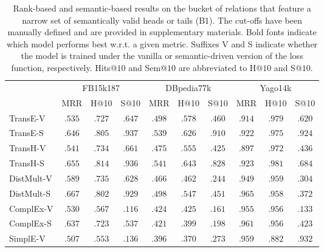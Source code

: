 \documentclass[letterpaper]{article} %
\begin{document}
\begin{table*}
        \caption{Rank-based and semantic-based results on the bucket of relations that feature a narrow set of semantically valid heads or tails (B1). The cut-offs have been manually defined and are provided in supplementary materials. Bold fonts indicate which model performs best w.r.t. a given metric. Suffixes V and S indicate whether the model is trained under the vanilla or semantic-driven version of the loss function, respectively. Hits@$10$ and Sem@$10$ are abbreviated to H@$10$ and S@$10$.}
	\label{tab:bucket1}
    \small
	\centering
                \setlength{\tabcolsep}{0.15cm}
			\begin{tabular}{lccccccccc}
                    \hline
				&\multicolumn{3}{c}{FB15k187} & \multicolumn{3}{c}{DBpedia77k} & \multicolumn{3}{c}{Yago14k} 
                \\
                    & MRR & H@10 & S@10 &
                    MRR & H@10 & S@10 &
                    MRR & H@10 & S@10 \\
				\hline
				TransE-V &
    $.535$&$.727$&$.647$& $.498$&$.578$&$.460$& $.914$&$\mathbf{.979}$&$.620$\\
                TransE-S &
    $\mathbf{.646}$&$\mathbf{.805}$&$\mathbf{.937}$& 
    $\mathbf{.539}$&$\mathbf{.626}$&$\mathbf{.910}$& 
    $\mathbf{.922}$&$.975$&$\mathbf{.924}$ \\
    \hline
                TransH-V &
    $.541$&$.734$&$.661$& $.475$&$.555$&$.425$& $.897$&$.972$&$.436$ \\
                TransH-S &
    $\mathbf{.655}$&$\mathbf{.814}$&$\mathbf{.936}$& 
    $\mathbf{.541}$&$\mathbf{.643}$&$\mathbf{.828}$& 
    $\mathbf{.923}$&$\mathbf{.981}$&$\mathbf{.684}$ \\
    \hline
                DistMult-V &
    $.589$&$.735$&$.628$& $.466$&$.462$&$.244$& $.949$&$\mathbf{.959}$&$.304$ \\
			  DistMult-S &
    $\mathbf{.667}$&$\mathbf{.802}$&$\mathbf{.929}$& 
    $\mathbf{.498}$&$\mathbf{.547}$&$\mathbf{.451}$& 
    $\mathbf{.965}$&$.958$&$\mathbf{.372}$ \\
    \hline
    		  ComplEx-V &
    $.530$&$.567$&$.116$& $\mathbf{.424}$&$\mathbf{.425}$&$.161$& $.955$&$.956$&$.133$ \\
    			ComplEx-S &
    $\mathbf{.637}$&$\mathbf{.723}$&$\mathbf{.537}$& 
    $.421$&$.399$&$\mathbf{.198}$& 
    $\mathbf{.961}$&$.956$&$\mathbf{.423}$ \\
    \hline
                SimplE-V &
    $.507$&$.553$&$.136$& $\mathbf{.396}$&$\mathbf{.370}$&$\mathbf{.273}$& $\mathbf{.959}$&$.882$&$\mathbf{.932}$ \\

\end{tabular}
\end{table*}
\end{document}
